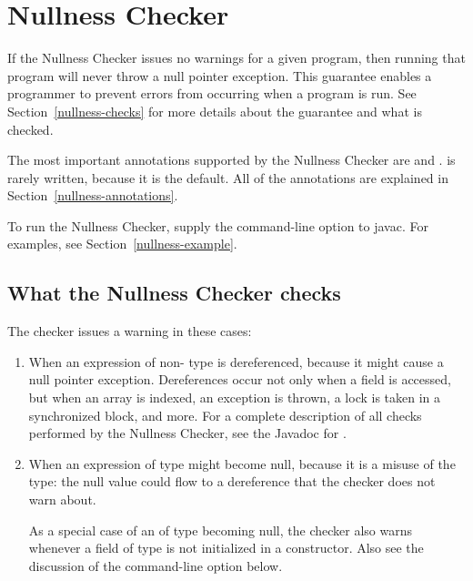 \htmlhr
\chapter{Nullness Checker\label{nullness-checker}}

If the Nullness Checker issues no warnings for a given program, then
running that program will never throw a null pointer exception.  This
guarantee enables a programmer to prevent errors from occurring when a
program is run.  See Section~\ref{nullness-checks} for more details about
the guarantee and what is checked.

The most important annotations supported by the Nullness Checker are 
 and 
.
 is rarely written, because it is
the default.  All of the annotations are explained in
Section~\ref{nullness-annotations}.

To run the Nullness Checker, supply the  command-line option to javac.  For
examples, see Section~\ref{nullness-example}.


\section{What the Nullness Checker checks\label{nullness-checks}}

The checker issues a warning in these cases:

\begin{enumerate}

\item
  When an expression of non- type
  is dereferenced, because it might cause a null pointer exception.
  Dereferences occur not only when a field is accessed, but when an array
  is indexed, an exception is thrown, a lock is taken in a synchronized
  block, and more.  For a complete description of all checks performed by
  the Nullness Checker, see the Javadoc for
  .

\item
  When an expression of  type
  might become null, because it
  is a misuse of the type:  the null value could flow to a dereference that
  the checker does not warn about.

  As a special case of an of 
  type becoming null, the checker also warns whenever a field of
   type is not initialized in a
  constructor.  Also see the discussion of the 
  command-line option below.

\end{enumerate}

